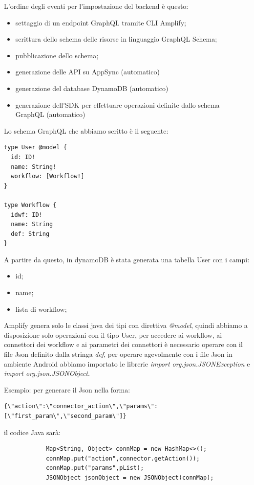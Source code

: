 L'ordine degli eventi per l'impostazione del backend è questo:

\begin{itemize}
\item settaggio di un endpoint GraphQL tramite CLI Amplify;
\item scrittura dello schema delle risorse in linguaggio GraphQL Schema;
\item pubblicazione dello schema;
\item generazione delle API su AppSync (automatico)
\item generazione del database DynamoDB (automatico)
\item generazione dell'SDK per effettuare operazioni definite dallo schema GraphQL (automatico)
\end{itemize}

Lo schema GraphQL che abbiamo scritto è il seguente:
\begin{verbatim}
type User @model {
  id: ID!
  name: String!
  workflow: [Workflow!]
}

type Workflow {
  idwf: ID!
  name: String
  def: String
}
\end{verbatim}


A partire da questo, in dynamoDB è stata generata una tabella User con i campi:
\begin{itemize}
\item id;
\item name;
\item lista di workflow;
\end{itemize}

Amplify genera solo le classi java dei tipi con direttiva \textit{@model}, quindi abbiamo a disposizione solo operazioni con il tipo User, per accedere ai workflow, ai connettori dei workflow e ai parametri dei connettori è necessario operare con il file Json definito dalla stringa \textit{def}, per operare agevolmente con i file Json in ambiente Android abbiamo importato le librerie \textit{import org.json.JSONException} e \textit{import org.json.JSONObject}.

Esempio: per generare il Json nella forma:

\begin{verbatim}
{\"action\":\"connector_action\",\"params\":[\"first_param\",\"second_param\"]}
\end{verbatim}

il codice Java sarà:

\begin{verbatim}
            Map<String, Object> connMap = new HashMap<>();
            connMap.put("action",connector.getAction());
            connMap.put("params",pList);
            JSONObject jsonObject = new JSONObject(connMap);
\end{verbatim}



